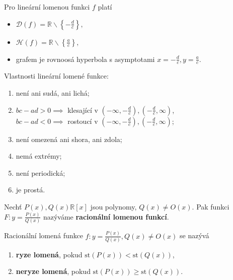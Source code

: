 \begin{pozn}
  Pro lineární lomenou funkci $f$ platí
  \begin{itemize}
      \item $\mathcal D(f)=\mathbb R \smallsetminus \left \{ -\frac{d}{c} \right \},$
    	\item $\mathcal H(f)=\mathbb R \smallsetminus \left \{ \frac{a}{c} \right \},$
     	\item grafem je rovnoosá hyperbola s asymptotami
      $x=-\frac{d}{c}, y=\frac{a}{c}.$
  \end{itemize}
\end{pozn}

\begin{veta}
    Vlastnosti lineární lomené funkce:
    \begin{enumerate}[$i.$]
        \item není ani sudá, ani lichá;
       	\item $bc-ad > 0 \implies$ klesající v
        $\left ( -\infty, -\frac{d}{c} \right ),
        \left ( -\frac{d}{c}, \infty \right ) $, \\
        $bc-ad < 0 \implies$ rostoucí v
        $\left ( -\infty, -\frac{d}{c} \right ),
        \left ( -\frac{d}{c}, \infty \right ) $;
       	\item není omezená ani shora, ani zdola;
       	\item nemá extrémy;
       	\item není periodická;
       	\item je prostá.
    \end{enumerate}
\end{veta}

\begin{definition}
    Nechť $P(x), Q(x) \mathbb R[x]$ jsou polynomy, $Q(x) \ne O(x).$
    Pak funkci $F\colon y=\frac{P(x)}{Q(x)}$ nazýváme \textbf{racionální lomenou funkcí}.
\end{definition}

\begin{definition}
    Racionální lomená funkce $f\colon y=\frac{P(x)}{Q(x)}, Q(x) \ne O(x)$
    se nazývá
    \begin{enumerate}[$i.$]
        \item \textbf{ryze lomená}, pokud $\text{st}\left (P(x) \right ) <
        \text{st}\left (Q(x) \right )$,
       	\item \textbf{neryze lomená}, pokud $\text{st}\left (P(x) \right ) \geq
        \text{st}\left (Q(x) \right )$.
    \end{enumerate}
\end{definition}

